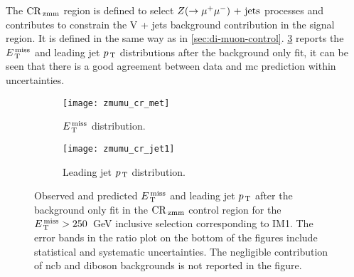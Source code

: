 The $\mathrm{CR}_\mathrm{\, zmm}$ region is defined to select $Z (\rightarrow \mu^+ \mu^-)\mathrm{~+~jets}$ processes and
contributes to constrain the V + jets background contribution in the signal
region. It is defined in the same way as in
\cref{sec:di-muon-control}. \cref{fig:dimu_cr_plots} reports the $E_\mathrm{\, T}^\mathrm{\, miss}$ and
leading jet $p_\mathrm{\, T}$ distributions after the background only fit, it can be seen
that there is a good agreement between data and \gls{mc} prediction within
uncertainties.
\begin{figure}[!htb]
  \centering
  \begin{subfigure}[t]{.48\linewidth}
    \texttt{[image: zmumu\_cr\_met]}
    \caption{$E_\mathrm{\, T}^\mathrm{\, miss}$ distribution.}
    \label{fig:dimu_cr_met}
  \end{subfigure}
  \begin{subfigure}[t]{.48\linewidth}
    \texttt{[image: zmumu\_cr\_jet1]}
    \caption{Leading jet $p_\mathrm{\, T}$ distribution.}
    \label{fig:dimu_cr_jet1}
  \end{subfigure}
  \caption{Observed and predicted $E_\mathrm{\, T}^\mathrm{\, miss}$ and leading jet $p_\mathrm{\, T}$ after the
    background only fit in the $\mathrm{CR}_\mathrm{\, zmm}$ control region for the $E_\mathrm{\, T}^\mathrm{\, miss} > 250$~GeV
    inclusive selection corresponding to IM1. The error bands in the ratio plot
    on the bottom of the figures include statistical and systematic
    uncertainties. The negligible contribution of \gls{ncb} and diboson
    backgrounds is not reported in the figure.}
  \label{fig:dimu_cr_plots}
\end{figure}
